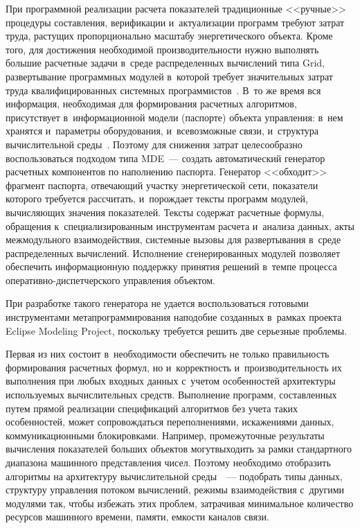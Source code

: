 \begin{multicols}{2}
   При программной реализации расчета показа\-телей традиционные 
<<ручные>> процедуры со\-став\-ле\-ния, верификации и~актуализации программ 
требуют затрат труда, растущих пропорционально масшта\-бу энергетического 
объекта. Кроме того, для достижения необходимой производительности нужно 
выполнять большие расчетные задачи в~среде распределенных вычислений 
типа Grid, развертывание программных модулей в~которой требует 
значительных затрат труда квалифицированных системных 
программистов~\cite{23-kov}. В~то же время вся информация, необходимая для 
формирования расчетных алгоритмов, присутствует в~информационной модели 
(паспорте) объекта управления: в~нем хранятся и~параметры оборудования, 
и~всевозможные связи, и~структура вычислительной среды~\cite{24-kov}. 
Поэтому для снижения затрат целесообразно воспользо\-ваться подходом типа 
MDE~--- создать автоматический генератор расчетных компонентов по 
наполнению паспорта. Генератор <<обходит>> фрагмент паспорта, отвечающий 
участку энергетической сети, показатели которого требуется рассчитать, 
и~порождает тексты программ модулей, вы\-чис\-ля\-ющих значения показателей. 
Тексты содержат расчетные формулы, обращения к~специализированным 
инструментам расчета и~анализа данных, акты межмодульного взаимодействия, 
системные вызовы для развертывания в~среде распределенных вычислений. 
Исполнение сгенерированных модулей позволяет обеспечить информационную 
поддержку принятия решений в~темпе процесса  
опе\-ра\-тив\-но-дис\-пет\-чер\-ско\-го управления объектом.
   
   При разработке такого генератора не удается воспользоваться готовыми 
инструментами метапрограммирования наподобие созданных в~рамках проекта 
Eclipse Modeling Project, поскольку требуется решить две серьезные проблемы. 

Первая из них состоит в~необходимости обеспечить не только правильность 
формирования расчетных формул, но и~корректность и~производительность их 
выполнения при любых входных данных с~учетом особенностей архитектуры 
используемых вычислительных средств. Выполнение программ, составленных 
путем прямой реализации спецификаций алгоритмов без учета таких 
особенностей, может сопровождаться переполнениями, искажениями данных, 
коммуникационными блокиров\-ками. Например, промежуточные результаты 
вы\-чис\-ле\-ния показателей больших объектов могут\linebreak выходить за рамки 
стандартного диапазона машинного представления чисел. Поэтому необходимо 
отобразить алгоритмы на архитектуру вы\-чис\-ли\-тель\-ной среды~\cite{25-kov}~--- 
подобрать типы данных, структуру управления потоком вычислений, режимы 
взаимодействия с~другими модулями так, чтобы избежать этих проблем, 
затрачивая минимальное количество ресурсов машинного времени, памяти, 
емкости каналов связи.
   

\end{multicols}

